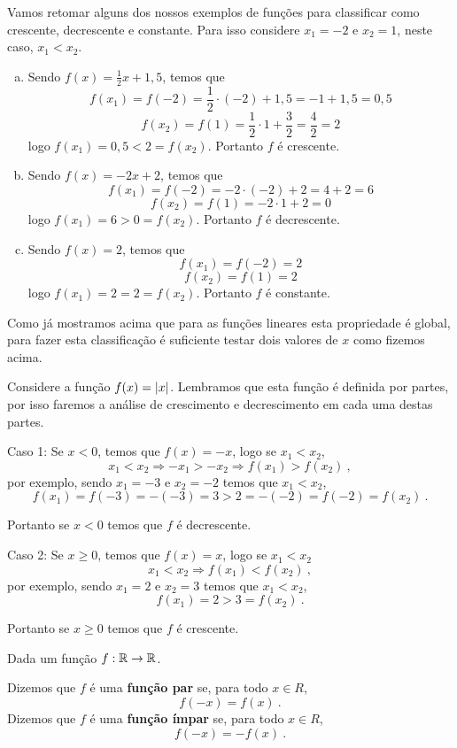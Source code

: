  \begin{exem}
 Vamos retomar alguns dos nossos exemplos de funções para classificar como crescente, decrescente e constante. Para isso considere $x_1= -2$ e $x_2= 1$, neste caso, $x_1 < x_2$.
  \begin{enumerate}[a)]
   \item Sendo $f(x)= \frac{1}{2}x + 1,5$, temos que
   \[f(x_1)= f(-2)= \frac{1}{2}\cdot (-2) + 1,5= -1 + 1,5= 0,5\]
   \[f(x_2)= f(1)= \frac{1}{2} \cdot 1+\frac{3}{2}= \frac{4}{2}= 2\]
   logo $f(x_1)= 0,5 < 2= f(x_2)$. Portanto $f$ é crescente.
   \item Sendo $f(x)= -2x + 2$, temos que
   \[f(x_1)= f(-2)= -2 \cdot (-2) + 2= 4 + 2= 6\]
   \[f(x_2)= f(1)= -2 \cdot 1 + 2= 0\]
   logo $f(x_1)= 6 > 0 = f(x_2)$. Portanto $f$ é decrescente.
   \item Sendo $f(x)= 2$, temos que
   \[f(x_1)= f(-2)= 2\]
   \[f(x_2)= f(1)= 2\]
   logo $f(x_1)= 2 = 2= f(x_2)$. Portanto $f$ é constante.
  \end{enumerate}
  Como já mostramos acima que para as funções lineares esta propriedade é global, para fazer esta classificação é suficiente testar dois valores de $x$ como fizemos acima.

 \end{exem}

 \begin{exem}
  Considere a função $f(x)= \left|x\right|$. Lembramos que esta função é definida por partes, por isso faremos a análise de crescimento e decrescimento em cada uma destas partes.

  Caso 1: Se $x < 0$, temos que $f(x)= -x$, logo se $x_1 < x_2$,
  \[x_1 < x_2 \Rightarrow -x_1 > -x_2 \Rightarrow f(x_1) > f(x_2) \ ,\]
  por exemplo, sendo $x_1= -3$ e $x_2= -2$ temos que $x_1 < x_2$,
  \[f(x_1)= f(-3)= -(-3)= 3 > 2= -(-2)= f(-2)= f(x_2) \ .\]

  Portanto se $x < 0$ temos que $f$ é decrescente.

  Caso 2: Se $x \geq 0$, temos que $f(x)= x$, logo se $x_1 < x_2$
  \[x_1 < x_2 \Rightarrow  f(x_1) < f(x_2) \ ,\]
  por exemplo, sendo $x_1= 2$ e $x_2= 3$ temos que $x_1 < x_2$,
  \[f(x_1)= 2 > 3= f(x_2) \ .\]

  Portanto se $x \geq 0$ temos que $f$ é crescente.
 \end{exem}



 \vskip0.3cm
 \colorbox{azul}{
 \begin{minipage}{0.9\linewidth}
 \begin{center}
  Dada um função $f: \mathbb{R} \rightarrow \mathbb{R}$.

  Dizemos que $f$ é uma \textbf{função par} se, para todo $x \in R$,
  \[f(-x)= f(x) \ .\]
  Dizemos que $f$ é uma \textbf{função ímpar} se, para todo $x \in R$,
  \[f(-x)= - f(x) \ .\]
 \end{center}
 \end{minipage}}
 \vskip0.3cm


